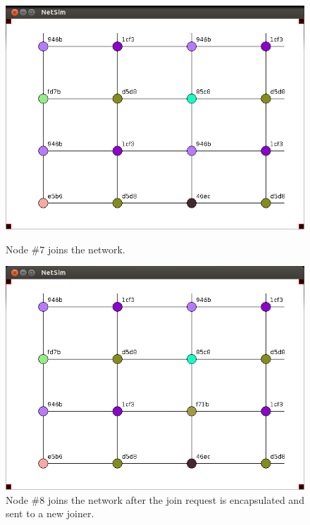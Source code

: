 \documentclass[ %
                    author={Luke Murray},
                supervisor={Dr. Simon Hollis},
                     title={Shadow Peer-to-Peer Networks},
                  subtitle={},
                    degree={MEng},
                      year={2013} ]{thesis}
\begin{document}
\begin{figure}[h]
    \centering
    \begin{minipage}[b]{0.45\linewidth}
        \centering
        \includegraphics[width=\linewidth]{sim_pics/expand_9.png}
        \caption{Node \#7 joins the network.}
        \label{sim_expand9}
    \end{minipage}
    \hspace{0.5cm}
    \begin{minipage}[b]{0.45\linewidth}
        \centering
        \includegraphics[width=\linewidth]{sim_pics/expand_10.png}
        \caption{Node \#8 joins the network after the join request is encapsulated and sent to a new joiner.}
        \label{sim_expand10}
    \end{minipage}
\end{figure}
\end{document}
